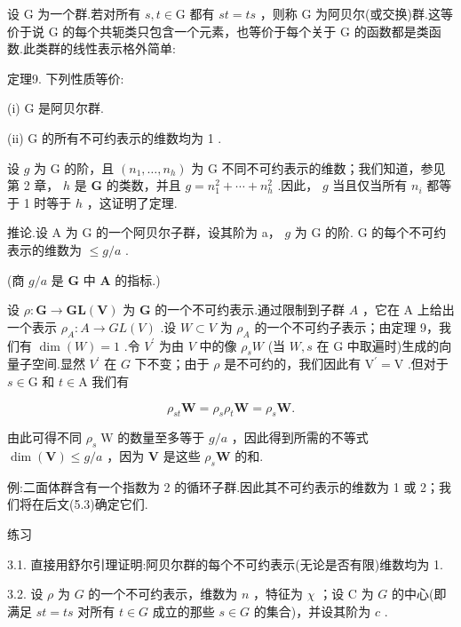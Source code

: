 \documentclass[10pt]{article}
\begin{document}
设 \(\mathrm{G}\) 为一个群.若对所有 \(s,t \in  \mathrm{G}\) 都有 \({st} = {ts}\) ，则称 \(\mathrm{G}\) 为阿贝尔(或交换)群.这等价于说 \(\mathrm{G}\) 的每个共轭类只包含一个元素，也等价于每个关于 \(\mathrm{G}\) 的函数都是类函数.此类群的线性表示格外简单:

定理9. 下列性质等价:

(i) \(\mathrm{G}\) 是阿贝尔群.

(ii) \(\mathrm{G}\) 的所有不可约表示的维数均为 1 .

设 \(g\) 为 \(\mathrm{G}\) 的阶，且 \(\left( {{n}_{1},\ldots ,{n}_{h}}\right)\) 为 \(\mathrm{G}\) 不同不可约表示的维数；我们知道，参见第 2 章， \(h\) 是 \(\mathbf{G}\) 的类数，并且 \(g = {n}_{1}^{2} + \cdots  + {n}_{h}^{2}\) .因此， \(g\) 当且仅当所有 \({n}_{i}\) 都等于 1 时等于 \(h\) ，这证明了定理.

推论.设 \(\mathrm{A}\) 为 \(\mathrm{G}\) 的一个阿贝尔子群，设其阶为 a， \(g\) 为 \(\mathrm{G}\) 的阶. \(\mathrm{G}\) 的每个不可约表示的维数为 \(\leq  g/a\) .

(商 \(g/a\) 是 \(\mathbf{G}\) 中 \(\mathbf{A}\) 的指标.)

设 \(\rho  : \mathbf{G} \rightarrow  \mathbf{{GL}}\left( \mathbf{V}\right)\) 为 \(\mathbf{G}\) 的一个不可约表示.通过限制到子群 \(A\) ，它在 A 上给出一个表示 \({\rho }_{A} : A \rightarrow  {GL}\left( V\right)\) .设 \(W \subset  V\) 为 \({\rho }_{A}\) 的一个不可约子表示；由定理 9，我们有 \(\dim \left( W\right)  = 1\) .令 \({V}^{\prime }\) 为由 \(V\) 中的像 \({\rho }_{s}W\) (当 \(W,s\) 在 G 中取遍时)生成的向量子空间.显然 \({V}^{\prime }\) 在 \(G\) 下不变；由于 \(\rho\) 是不可约的，我们因此有 \({\mathrm{V}}^{\prime } = \mathrm{V}\) .但对于 \(s \in  \mathrm{G}\) 和 \(t \in  \mathrm{A}\) 我们有

\[
{\rho }_{st}\mathbf{W} = {\rho }_{s}{\rho }_{t}\mathbf{W} = {\rho }_{s}\mathbf{W}.
\]

由此可得不同 \({\rho }_{s}\mathrm{\;W}\) 的数量至多等于 \(g/a\) ，因此得到所需的不等式 \(\dim \left( \mathbf{V}\right)  \leq  g/a\) ，因为 \(\mathbf{V}\) 是这些 \({\rho }_{s}\mathbf{W}\) 的和.

例:二面体群含有一个指数为 2 的循环子群.因此其不可约表示的维数为 1 或 2；我们将在后文(5.3)确定它们.

练习

3.1. 直接用舒尔引理证明:阿贝尔群的每个不可约表示(无论是否有限)维数均为 1.

3.2. 设 \(\rho\) 为 \(G\) 的一个不可约表示，维数为 \(n\) ，特征为 \(\chi\) ；设 C 为 \(G\) 的中心(即满足 \({st} = {ts}\) 对所有 \(t \in  G\) 成立的那些 \(s \in  G\) 的集合)，并设其阶为 \(c\) .
\end{document}
